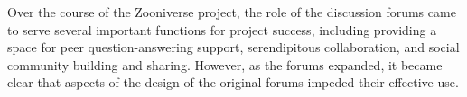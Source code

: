 \documentclass{sigchi}
\begin{document}


Over the course of the Zooniverse project, the role of the discussion forums came to serve several important functions for project success, including providing a space for peer question-answering support, serendipitous collaboration, and social community building and sharing. However, as the forums expanded, it became clear that aspects of the design of the original forums impeded their effective use.   
\end{document}
